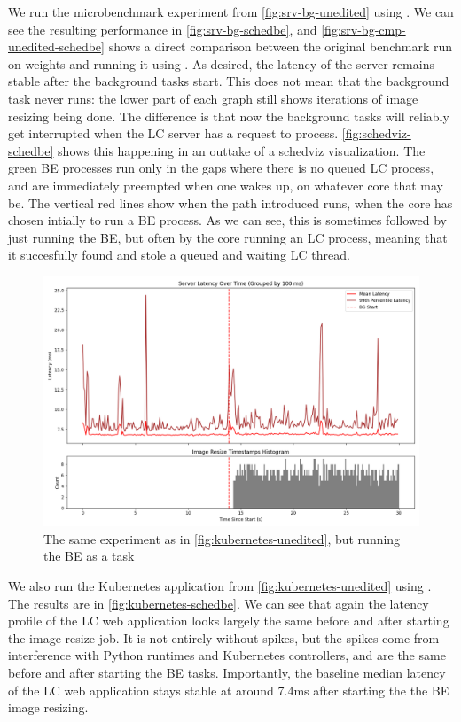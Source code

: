 We run the microbenchmark experiment from \autoref{fig:srv-bg-unedited} using
\schedbe{}. We can see the resulting performance in
\autoref{fig:srv-bg-schedbe}, and \autoref{fig:srv-bg-cmp-unedited-schedbe}
shows a direct comparison between the original benchmark run on \cgroups{}
weights and running it using \schedbe{}. As desired, the latency of the server
remains stable after the background tasks start. This does not mean that the
background task never runs: the lower part of each graph still shows iterations
of image resizing being done. The difference is that now the background tasks
will reliably get interrupted when the LC server has a request to process.
\autoref{fig:schedviz-schedbe} shows this happening in an outtake of a schedviz
visualization. The green BE processes run only in the gaps where there is no
queued LC process, and are immediately preempted when one wakes up, on whatever
core that may be. The vertical red lines show when the \exit{} path \schedbe{}
introduced runs, \ie{} when the core has chosen intially to run a BE process. As
we can see, this is sometimes followed by just running the BE, but often by the
core running an LC process, meaning that it succesfully found and stole a queued
and waiting LC thread.

\begin{figure}[t]
    \centering
    \includegraphics[width=\columnwidth]{graphs/kubernetes-schedbe.png}
    \caption{The same experiment as in \autoref{fig:kubernetes-unedited}, but
    running the BE as a \schedbe{} task}\label{fig:kubernetes-schedbe}
\end{figure}

We also run the Kubernetes application from \autoref{fig:kubernetes-unedited}
using \schedbe{}. The results are in \autoref{fig:kubernetes-schedbe}. We can
see that again the latency profile of the LC web application looks largely the
same before and after starting the image resize job. It is not entirely without
spikes, but the spikes come from interference with Python runtimes and
Kubernetes controllers, and are the same before and after starting the BE tasks.
Importantly, the baseline median latency of the LC web application stays stable
at around 7.4ms after starting the the BE image resizing. 

